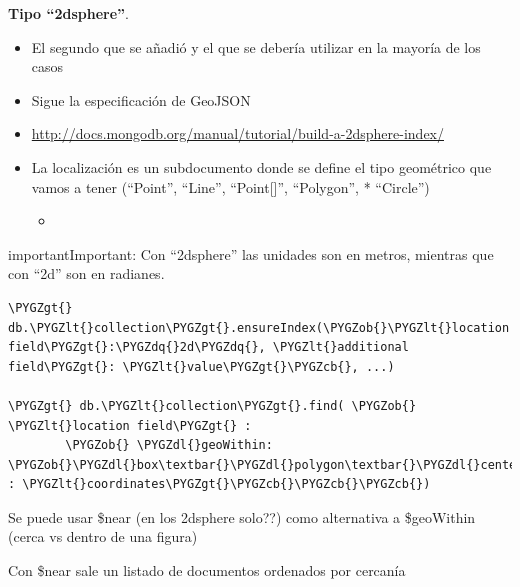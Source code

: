 \documentclass[a4paper,10pt,english]{sphinxmanual}
\def\PYGZob{\char`\{}
\def\PYGZcb{\char`\}}
\def\PYGZlt{\char`\<}
\def\PYGZgt{\char`\>}
\def\PYGZdl{\char`\$}
\def\PYGZdq{\char`\"}
\begin{document}
\textbf{Tipo ``2dsphere''}.
\begin{itemize}
\item {} 
El segundo que se añadió y el que se debería utilizar en la mayoría de los casos

\item {} 
Sigue la especificación de GeoJSON

\item {} 
\href{http://docs.mongodb.org/manual/tutorial/build-a-2dsphere-index/}{http://docs.mongodb.org/manual/tutorial/build-a-2dsphere-index/}

\item {} 
La localización es un subdocumento donde se define el tipo geométrico que vamos a tener (``Point'', ``Line'', ``Point{[}{]}'', ``Polygon'', *  ``Circle'')
\begin{itemize}
\item {} 

\end{itemize}

\end{itemize}

\begin{notice}{important}{Important:}
Con ``2dsphere'' las unidades son en metros, mientras que con ``2d'' son en radianes.
\end{notice}

\begin{Verbatim}[commandchars=\\\{\}]
\PYGZgt{} db.\PYGZlt{}collection\PYGZgt{}.ensureIndex(\PYGZob{}\PYGZlt{}location field\PYGZgt{}:\PYGZdq{}2d\PYGZdq{}, \PYGZlt{}additional field\PYGZgt{}: \PYGZlt{}value\PYGZgt{}\PYGZcb{}, ...)

\PYGZgt{} db.\PYGZlt{}collection\PYGZgt{}.find( \PYGZob{} \PYGZlt{}location field\PYGZgt{} :
        \PYGZob{} \PYGZdl{}geoWithin: \PYGZob{}\PYGZdl{}box\textbar{}\PYGZdl{}polygon\textbar{}\PYGZdl{}center : \PYGZlt{}coordinates\PYGZgt{}\PYGZcb{}\PYGZcb{}\PYGZcb{})
\end{Verbatim}

Se puede usar \$near (en los 2dsphere solo??) como alternativa a \$geoWithin (cerca vs dentro de una figura)

Con \$near sale un listado de documentos ordenados por cercanía
\end{document}
